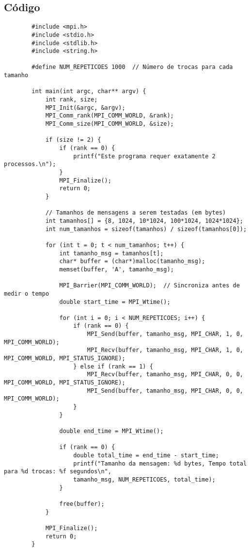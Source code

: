 \documentclass[a4paper, 12pt]{article}
\begin{document}
	\subsection{Código}
	\begin{verbatim}
		#include <mpi.h>
		#include <stdio.h>
		#include <stdlib.h>
		#include <string.h>
		
		#define NUM_REPETICOES 1000  // Número de trocas para cada tamanho
		
		int main(int argc, char** argv) {
			int rank, size;
			MPI_Init(&argc, &argv);
			MPI_Comm_rank(MPI_COMM_WORLD, &rank);
			MPI_Comm_size(MPI_COMM_WORLD, &size);
			
			if (size != 2) {
				if (rank == 0) {
					printf("Este programa requer exatamente 2 processos.\n");
				}
				MPI_Finalize();
				return 0;
			}
			
			// Tamanhos de mensagens a serem testadas (em bytes)
			int tamanhos[] = {8, 1024, 10*1024, 100*1024, 1024*1024};
			int num_tamanhos = sizeof(tamanhos) / sizeof(tamanhos[0]);
			
			for (int t = 0; t < num_tamanhos; t++) {
				int tamanho_msg = tamanhos[t];
				char* buffer = (char*)malloc(tamanho_msg);
				memset(buffer, 'A', tamanho_msg);
				
				MPI_Barrier(MPI_COMM_WORLD);  // Sincroniza antes de medir o tempo
				double start_time = MPI_Wtime();
				
				for (int i = 0; i < NUM_REPETICOES; i++) {
					if (rank == 0) {
						MPI_Send(buffer, tamanho_msg, MPI_CHAR, 1, 0, MPI_COMM_WORLD);
						MPI_Recv(buffer, tamanho_msg, MPI_CHAR, 1, 0, MPI_COMM_WORLD, MPI_STATUS_IGNORE);
					} else if (rank == 1) {
						MPI_Recv(buffer, tamanho_msg, MPI_CHAR, 0, 0, MPI_COMM_WORLD, MPI_STATUS_IGNORE);
						MPI_Send(buffer, tamanho_msg, MPI_CHAR, 0, 0, MPI_COMM_WORLD);
					}
				}
				
				double end_time = MPI_Wtime();
				
				if (rank == 0) {
					double total_time = end_time - start_time;
					printf("Tamanho da mensagem: %d bytes, Tempo total para %d trocas: %f segundos\n",
					tamanho_msg, NUM_REPETICOES, total_time);
				}
				
				free(buffer);
			}
			
			MPI_Finalize();
			return 0;
		}
		
	\end{verbatim}
	

	
	
	
\end{document}
